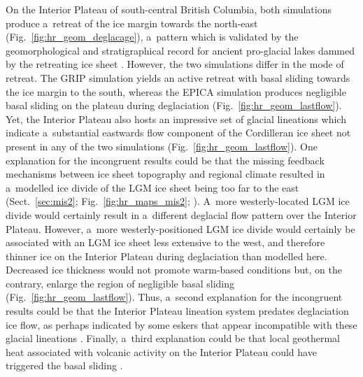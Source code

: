 \documentclass[tc, manuscript]{copernicus}
\begin{document}
      On the Interior Plateau of south-central British Columbia, both
      simulations produce a~retreat of the ice margin towards the north-east
      (Fig.~\ref{fig:hr_geom_deglacage}), a~pattern which is validated by
      the geomorphological and stratigraphical record for ancient
      pro-glacial lakes dammed by the retreating ice sheet
      \citep{Perkins.Brennand.2015}. However, the two simulations differ in
      the mode of retreat. The GRIP simulation yields an active retreat with
      basal sliding towards the ice margin to the south, whereas the EPICA
      simulation produces negligible basal sliding on the plateau during
      deglaciation (Fig.~\ref{fig:hr_geom_lastflow}). Yet, the Interior
      Plateau also hosts an impressive set of glacial lineations which
      indicate a~substantial eastwards flow component of the Cordilleran ice
      sheet \citep{Prest.etal.1968, Kleman.etal.2010, Ferbey.etal.2013}
      not present in any of the two simulations
      (Fig.~\ref{fig:hr_geom_lastflow}). One explanation for the
      incongruent results could be that the missing feedback mechanisms
      between ice sheet topography and regional climate resulted in
      a~modelled ice divide of the LGM ice sheet being too far to the east
      (Sect.~\ref{sec:mis2}; Fig.~\ref{fig:hr_maps_mis2};
      \citealp{Seguinot.etal.2014}). A~more westerly-located LGM ice divide
      would certainly result in a~different deglacial flow pattern over the
      Interior Plateau. However, a~more westerly-positioned LGM ice divide
      would certainly be associated with an LGM ice sheet less extensive to
      the west, and therefore thinner ice on the Interior Plateau during
      deglaciation than
      modelled here. Decreased ice thickness would not promote warm-based
      conditions but, on the contrary, enlarge the region of negligible
      basal sliding (Fig.~\ref{fig:hr_geom_lastflow}). Thus, a~second
      explanation for the incongruent results could be that the Interior
      Plateau lineation system predates deglaciation ice flow, as perhaps
      indicated by some eskers that appear incompatible with these glacial
      lineations \citep[Fig.~9]{Margold.etal.2013a}. Finally, a~third
      explanation could be that local geothermal heat associated with
      volcanic activity on the Interior Plateau could have triggered the
      basal sliding \citep[cf. Greenland ice
      sheet;][]{Fahnestock.etal.2001}.
\end{document}
